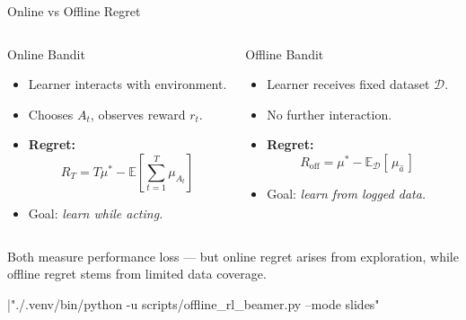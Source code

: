 \documentclass[aspectratio=169]{beamer}
\providecommand{\buildmode}{slides}
\begin{document}
\begin{frame}{Online vs Offline Regret}

\begin{columns}[T,onlytextwidth]
\begin{block}{\centering Online Bandit}
\begin{itemize}
    \item Learner interacts with environment.
    \item Chooses $A_t$, observes reward $r_t$.
    \item \textbf{Regret:}
    \[
    R_T = T\mu^* - \mathbb{E}\!\left[\sum_{t=1}^T \mu_{A_t}\right]
    \]
    \item Goal: \textit{learn while acting.}
\end{itemize}
\end{block}

\begin{block}{\centering Offline Bandit}
\begin{itemize}
    \item Learner receives fixed dataset $\mathcal{D}$.
    \item No further interaction.
    \item \textbf{Regret:}
    \[
    R_{\text{off}} = \mu^* - \mathbb{E}_{\mathcal{D}}[\,\mu_{\hat{a}}\,]
    \]
    \item Goal: \textit{learn from logged data.}
\end{itemize}
\end{block}
\end{columns}

\vspace{0.8em}
\pause
\centering
\textcolor{gray!70}{Both measure performance loss — but online regret arises from exploration, while offline regret stems from limited data coverage.}

\end{frame}

|"./.venv/bin/python -u scripts/offline_rl_beamer.py --mode \buildmode"
\end{document}
